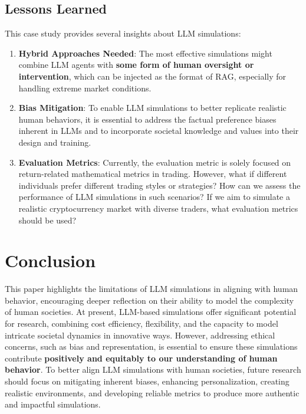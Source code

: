 \subsection{Lessons Learned}
This case study provides several insights about LLM simulations:

\begin{enumerate}
\item \textbf{Hybrid Approaches Needed}: The most effective simulations might combine LLM agents with \textbf{some form of human oversight or intervention}, which can be injected as the format of RAG, especially for handling extreme market conditions.
\item \textbf{Bias Mitigation}: To enable LLM simulations to better replicate realistic human behaviors, it is essential to address the factual preference biases inherent in LLMs and to incorporate societal knowledge and values into their design and training.
\item \textbf{Evaluation Metrics}: Currently, the evaluation metric is solely focused on return-related mathematical metrics in trading. However, what if different individuals prefer different trading styles or strategies? How can we assess the performance of LLM simulations in such scenarios? If we aim to simulate a realistic cryptocurrency market with diverse traders, what evaluation metrics should be used?
\end{enumerate}

\section{Conclusion}
This paper highlights the limitations of LLM simulations in aligning with human behavior, encouraging deeper reflection on their ability to model the complexity of human societies. At present, LLM-based simulations offer significant potential for research, combining cost efficiency, flexibility, and the capacity to model intricate societal dynamics in innovative ways. However, addressing ethical concerns, such as bias and representation, is essential to ensure these simulations contribute \textbf{positively and equitably to our understanding of human behavior}. To better align LLM simulations with human societies, future research should focus on mitigating inherent biases, enhancing personalization, creating realistic environments, and developing reliable metrics to produce more authentic and impactful simulations.
